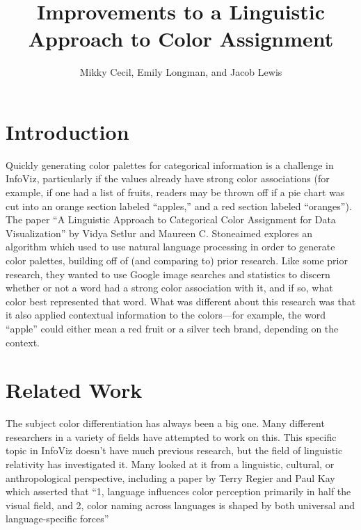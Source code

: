 \documentclass[journal]{vgtc}                %
\title{Improvements to a Linguistic Approach to Color Assignment}
\author{Mikky Cecil, Emily Longman, and Jacob Lewis}
\begin{document}


\maketitle

\section{Introduction} %
Quickly generating color palettes for categorical information is a challenge in InfoViz, particularly if the values already have strong color associations (for example, if one had a list of fruits, readers may be thrown off if a pie chart was cut into an orange section labeled ``apples,'' and a red section labeled ``oranges''). 
The paper ``A Linguistic Approach to Categorical Color Assignment
for Data Visualization'' by Vidya Setlur and Maureen C. Stoneaimed \cite{basis}
explores an algorithm which used to use natural language processing in order to generate color palettes, building off of (and comparing to) prior research. 
Like some prior research, they wanted to use Google image searches and statistics to discern whether or not a word had a strong color association with it, and if so, what color best represented that word. What was different about this research was that it also applied contextual information to the colors---for example, the word ``apple'' could either mean a red fruit or a silver tech brand, depending on the context.

\section{Related Work}
The subject color differentiation has always been a big one.
Many different researchers in a variety of fields have attempted to work on this.
This specific topic in InfoViz doesn't have much previous research, but the field of linguistic relativity has investigated it.
Many looked at it from a linguistic, cultural, or anthropological perspective, including a paper by Terry Regier and Paul Kay which asserted that ``1, language influences color perception primarily in half
the visual field, and 2, color naming across languages is
shaped by both universal and language-specific forces'' \cite{Whorf}
\end{document}
